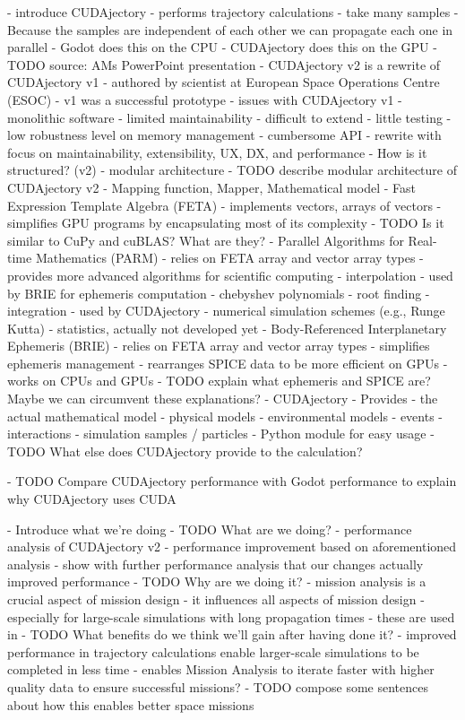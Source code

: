- introduce CUDAjectory
	- performs trajectory calculations
		- take many samples
		- Because the samples are independent of each other we can propagate each one in parallel
		- Godot does this on the CPU
		- CUDAjectory does this on the GPU
	- TODO source: AMs PowerPoint presentation
	- CUDAjectory v2 is a rewrite of CUDAjectory v1
		- authored by scientist at European Space Operations Centre (ESOC)
		- v1 was a successful prototype
		- issues with CUDAjectory v1
			- monolithic software
				- limited maintainability
				- difficult to extend
			- little testing
			- low robustness level on memory management
			- cumbersome API
		- rewrite with focus on maintainability, extensibility, UX, DX, and performance
	- How is it structured? (v2)
		- modular architecture
			- TODO describe modular architecture of CUDAjectory v2
			- Mapping function, Mapper, Mathematical model
		- Fast Expression Template Algebra (FETA)
			- implements vectors, arrays of vectors
			- simplifies GPU programs by encapsulating most of its complexity
			- TODO Is it similar to CuPy and cuBLAS? What are they?
		- Parallel Algorithms for Real-time Mathematics (PARM)
			- relies on FETA array and vector array types
			- provides more advanced algorithms for scientific computing
				- interpolation
					- used by BRIE for ephemeris computation
					- chebyshev polynomials
				- root finding
				- integration
					- used by CUDAjectory
					- numerical simulation schemes (e.g., Runge Kutta)
				- statistics, actually not developed yet
		- Body-Referenced Interplanetary Ephemeris (BRIE)
			- relies on FETA array and vector array types
			- simplifies ephemeris management
			- rearranges SPICE data to be more efficient on GPUs
			- works on CPUs and GPUs
			- TODO explain what ephemeris and SPICE are? Maybe we can circumvent these explanations?
		- CUDAjectory
			- Provides
				- the actual mathematical model
				- physical models
				- environmental models
				- events
				- interactions
				- simulation samples / particles
			- Python module for easy usage
			- TODO What else does CUDAjectory provide to the calculation?

- TODO Compare CUDAjectory performance with Godot performance to explain why CUDAjectory uses CUDA

- Introduce what we're doing
	- TODO What are we doing?
		- performance analysis of CUDAjectory v2
		- performance improvement based on aforementioned analysis
		- show with further performance analysis that our changes actually improved performance
	- TODO Why are we doing it?
		- mission analysis is a crucial aspect of mission design
			- it influences all aspects of mission design
		- especially for large-scale simulations with long propagation times
			- these are used in 
	- TODO What benefits do we think we'll gain after having done it?
		- improved performance in trajectory calculations enable larger-scale simulations to be completed in less time
		- enables Mission Analysis to iterate faster with higher quality data to ensure successful missions?
		- TODO compose some sentences about how this enables better space missions
